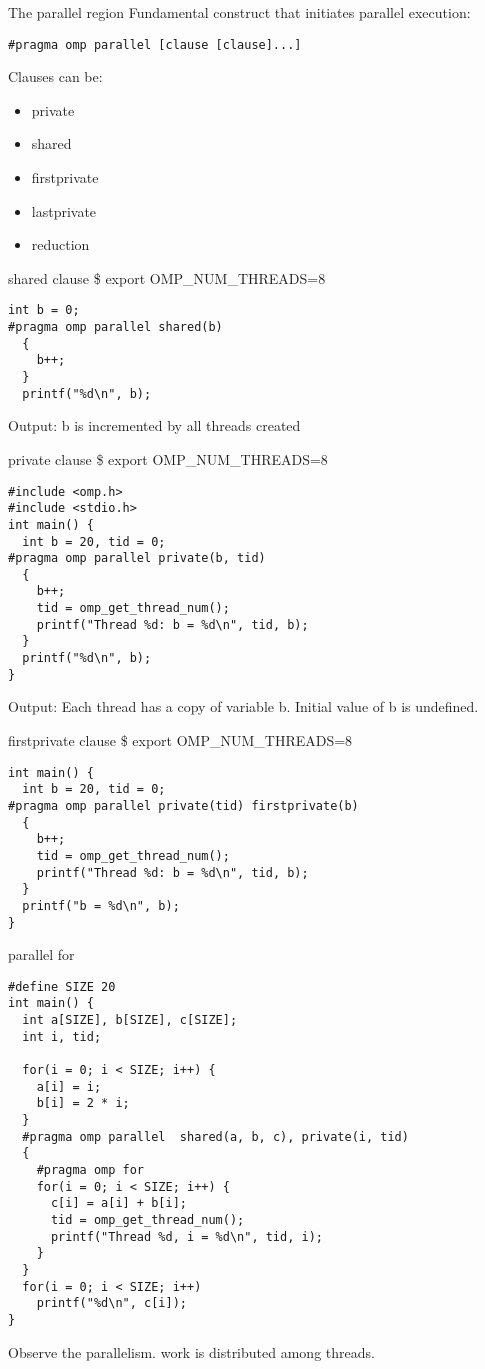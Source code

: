 \documentclass[10pt]{beamer}
\begin{document}
\begin{frame}[fragile]{The parallel region}
Fundamental construct that initiates parallel execution:
\begin{Verbatim}
#pragma omp parallel [clause [clause]...]
\end{Verbatim}
Clauses can be:
\begin{itemize}
\item private
\item shared
\item firstprivate
\item lastprivate
\item reduction
\end{itemize}
\end{frame}

\begin{frame}[fragile]{shared clause}
\$ export OMP\_NUM\_THREADS=8
\begin{Verbatim}[fontsize=\small, formatcom=\color{red}]
  int b = 0;
#pragma omp parallel shared(b)
  {
    b++;
  }
  printf("%d\n", b);
\end{Verbatim}
Output: b is incremented by all threads created
\end{frame}

\begin{frame}[fragile]{private clause}
\$ export OMP\_NUM\_THREADS=8
\begin{Verbatim}[fontsize=\small, formatcom=\color{red}]
#include <omp.h>
#include <stdio.h>
int main() {
  int b = 20, tid = 0;
#pragma omp parallel private(b, tid)
  {
    b++;
    tid = omp_get_thread_num();
    printf("Thread %d: b = %d\n", tid, b);
  }
  printf("%d\n", b);
}
\end{Verbatim}
Output: Each thread has a copy of variable b. Initial value of b is undefined.
\end{frame}

\begin{frame}[fragile]{firstprivate clause}
\$ export OMP\_NUM\_THREADS=8
\begin{Verbatim}[fontsize=\small, formatcom=\color{red}]
int main() {
  int b = 20, tid = 0;
#pragma omp parallel private(tid) firstprivate(b)
  {
    b++;
    tid = omp_get_thread_num();
    printf("Thread %d: b = %d\n", tid, b);
  }
  printf("b = %d\n", b);
}
\end{Verbatim}
\end{frame}

\begin{frame}[fragile]{parallel for}
\begin{Verbatim}[fontsize=\small, formatcom=\color{red}]
#define SIZE 20
int main() {        
  int a[SIZE], b[SIZE], c[SIZE];
  int i, tid;

  for(i = 0; i < SIZE; i++) {
    a[i] = i;
    b[i] = 2 * i;
  }
  #pragma omp parallel  shared(a, b, c), private(i, tid)
  {
    #pragma omp for
    for(i = 0; i < SIZE; i++) {
      c[i] = a[i] + b[i];
      tid = omp_get_thread_num();
      printf("Thread %d, i = %d\n", tid, i);
    }
  }
  for(i = 0; i < SIZE; i++)
    printf("%d\n", c[i]);
}
\end{Verbatim}
Observe the parallelism. work is distributed among threads.
\end{frame}
\end{document}
